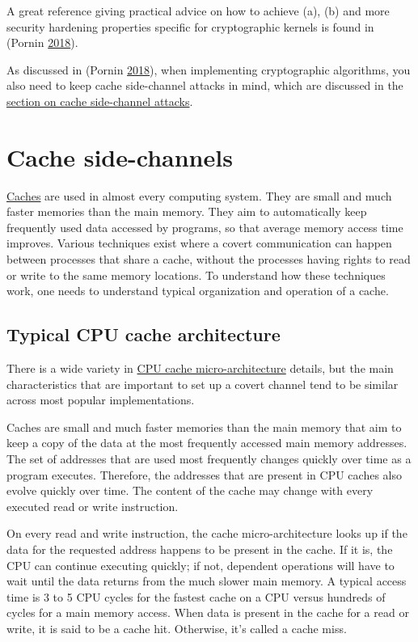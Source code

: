 \documentclass[a4paper,]{report}
\begin{document}
A great reference giving practical advice on how to achieve (a), (b) and
more security hardening properties specific for cryptographic kernels is
found in (Pornin \protect\hyperlink{ref-Pornin2018}{2018}).

As discussed in (Pornin \protect\hyperlink{ref-Pornin2018}{2018}), when
implementing cryptographic algorithms, you also need to keep cache
side-channel attacks in mind, which are discussed in the
\protect\hyperlink{cache-side-channel-attacks}{section on cache
side-channel attacks}.

\hypertarget{cache-side-channels}{%
\section{Cache side-channels}\label{cache-side-channels}}

\href{https://en.wikipedia.org/wiki/Cache_(computing)}{Caches}
are used in almost every computing system. They are small and much
faster memories than the main memory. They aim to automatically keep
frequently used data accessed by programs, so that average memory access
time improves. Various techniques exist where a covert communication can
happen between processes that share a cache, without the processes
having rights to read or write to the same memory locations. To
understand how these techniques work, one needs to understand typical
organization and operation of a cache.

\hypertarget{typical-cpu-cache-architecture}{%
\subsection{Typical CPU cache
architecture}\label{typical-cpu-cache-architecture}}

There is a wide variety in
\href{https://en.wikipedia.org/wiki/CPU_cache}{CPU cache
micro-architecture} details, but the main characteristics that are
important to set up a covert channel tend to be similar across most
popular implementations.

Caches are small and much faster memories than the main memory that aim
to keep a copy of the data at the most frequently accessed main memory
addresses. The set of addresses that are used most frequently changes
quickly over time as a program executes. Therefore, the addresses that
are present in CPU caches also evolve quickly over time. The content of
the cache may change with every executed read or write instruction.

On every read and write instruction, the cache micro-architecture looks
up if the data for the requested address happens to be present in the
cache. If it is, the CPU can continue executing quickly; if not,
dependent operations will have to wait until the data returns from the
much slower main memory. A typical access time is 3 to 5 CPU cycles for
the fastest cache on a CPU versus hundreds of cycles for a main memory
access. When data is present in the cache for
a read or write, it is said to be a cache hit.
Otherwise, it's called a cache miss.
\end{document}
